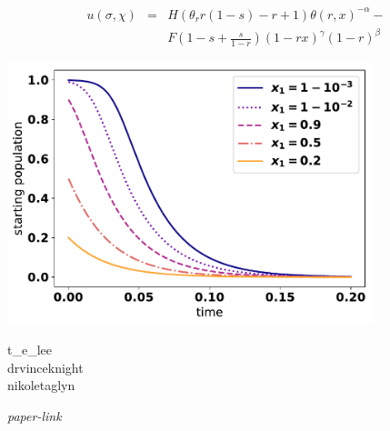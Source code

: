 \documentclass{beamer}
\begin{document}
\begin{frame}
    \hbox{\hspace{-2em}}
\end{frame}

\begin{frame}
\Large{
    \begin{eqnarray*}{}
    u(\sigma, \chi) &=&
    H (\theta_r r(1 - s) - r + 1) \theta(r, x)^{-\alpha} - 
    \\ && F \left(1 - s + \frac{s}{1 - r} \right)(1-rx)^{\gamma}(1 - r)^{\beta}
\end{eqnarray*}
}
\end{frame}

\begin{frame}
    \hbox{\hspace{-2em}}
\end{frame}

\begin{frame}
    \centering
    \includegraphics[width=0.8\textwidth]{static/IndiscriminateESS.pdf}
\end{frame}

\begin{frame}
	\begin{center}
		\Large{\faTwitter t\_e\_lee}\\
		\Large{\faTwitter drvinceknight}\\
                        \Large{\faTwitter nikoletaglyn}\\

                        \hspace{5pt}
                        
                        \small{\textit{paper-link}}\\
	\end{center}
\end{frame}
\end{document}
